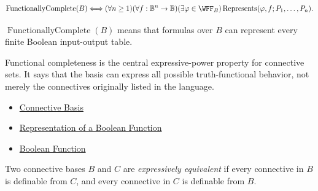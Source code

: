 \begin{remark*}
\[
\operatorname{FunctionallyComplete}(B)
\Longleftrightarrow
(\forall n\ge 1)(\forall f:\mathbb{B}^n\to\mathbb{B})(\exists\varphi\in\WFF_B)
\operatorname{Represents}(\varphi,f;P_1,\ldots,P_n).
\]
\end{remark*}

\begin{remark*}
\(\operatorname{FunctionallyComplete}(B)\) means that formulas over \(B\) can
represent every finite Boolean input-output table.
\end{remark*}

\begin{remark*}[Interpretation]
Functional completeness is the central expressive-power property for connective
sets. It says that the basis can express all possible truth-functional behavior,
not merely the connectives originally listed in the language.
\end{remark*}

\begin{dependencies}
\begin{itemize}
  \item \hyperref[def:connective-basis-propositional-logic]{Connective Basis}
  \item \hyperref[def:boolean-function-representation-propositional-logic]{Representation of a Boolean Function}
  \item \hyperref[def:boolean-function-propositional-logic]{Boolean Function}
\end{itemize}
\end{dependencies}

\begin{tcolorbox}[colback=propbox, colframe=propborder, arc=2pt,
  left=6pt, right=6pt, top=4pt, bottom=4pt,
  title={\small\textbf{Definition (Expressively Equivalent Connective Sets)}},
  fonttitle=\small\bfseries]
\begin{definition}
\label{def:expressively-equivalent-connective-sets-propositional-logic}
Two connective bases \(B\) and \(C\) are \emph{expressively equivalent} if every
connective in \(B\) is definable from \(C\), and every connective in \(C\) is
definable from \(B\).
\end{definition}
\end{tcolorbox}

